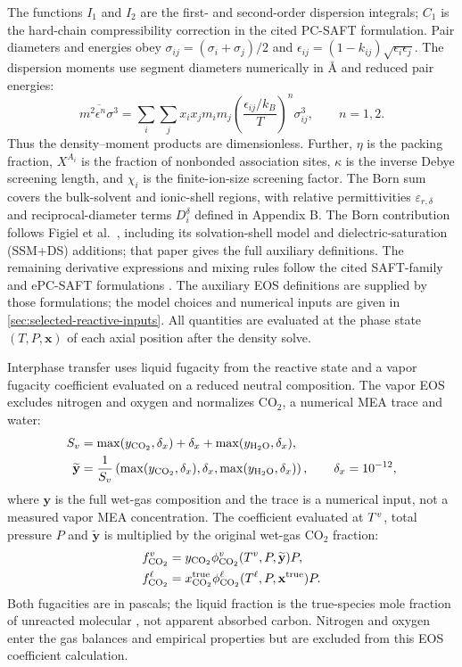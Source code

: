 The functions $I_1$ and $I_2$ are the first- and second-order dispersion integrals; $C_1$ is the hard-chain compressibility correction in the cited PC-SAFT formulation.
Pair diameters and energies obey $\sigma_{ij}=(\sigma_i+\sigma_j)/2$ and $\epsilon_{ij}=(1-k_{ij})\sqrt{\epsilon_i\epsilon_j}$.
The dispersion moments use segment diameters numerically in \unit{\angstrom} and reduced pair energies:
\begin{equation}
\overline{m^2\epsilon^n\sigma^3}
=\sum_i\sum_j x_i x_j m_i m_j
\left(\frac{\epsilon_{ij}/k_B}{T}\right)^n\sigma_{ij}^3,
\qquad n=1,2.
\end{equation}
Thus the density--moment products are dimensionless.
Further, $\eta$ is the packing fraction, $X^{A_i}$ is the fraction of nonbonded association sites, $\kappa$ is the inverse Debye screening length, and $\chi_i$ is the finite-ion-size screening factor.
The Born sum covers the bulk-solvent and ionic-shell regions, with relative permittivities $\varepsilon_{r,\delta}$ and reciprocal-diameter terms $D_i^{\delta}$ defined in Appendix B.
The Born contribution follows Figiel et al.\ \cite{Figiel2025}, including its solvation-shell model and dielectric-saturation (SSM+DS) additions; that paper gives the full auxiliary definitions.
The remaining derivative expressions and mixing rules follow the cited SAFT-family and ePC-SAFT formulations \cite{Gross2001,Cameretti2005,Bulow2019,Bulow2020,Bulow2021a}.
The auxiliary EOS definitions are supplied by those formulations; the model choices and numerical inputs are given in \cref{sec:selected-reactive-inputs}.
All quantities are evaluated at the phase state $(T,P,\mathbf{x})$ of each axial position after the density solve.

Interphase \COtwo{} transfer uses liquid fugacity from the reactive state and a vapor fugacity coefficient evaluated on a reduced neutral composition.
The vapor EOS excludes nitrogen and oxygen and normalizes CO$_2$, a numerical MEA trace and water:
\begin{align}
S_v&=\max(y_{\COtwo},\delta_x)+\delta_x+\max(y_{\HtwoO},\delta_x),\\
\widetilde{\mathbf y}&=\frac{1}{S_v}
\left(\max(y_{\COtwo},\delta_x),\delta_x,\max(y_{\HtwoO},\delta_x)\right),
\qquad\delta_x=10^{-12},\label{eq:reduced-vapor}\end{align}
where $\mathbf y$ is the full wet-gas composition and the trace is a numerical input, not a measured vapor MEA concentration.
The coefficient evaluated at $T^v$, total pressure $P$ and $\widetilde{\mathbf y}$ is multiplied by the original wet-gas CO$_2$ fraction:
\begin{align}
f_{\COtwo}^{\vap}&=y_{\COtwo}\phi_{\COtwo}^{\vap}(T^\vap,P,\widetilde{\mathbf y})P,\\
f_{\COtwo}^{\liq}&=x_{\COtwo}^{\mathrm{true}}\phi_{\COtwo}^{\liq}(T^\liq,P,\mathbf x^{\mathrm{true}})P.
\label{eq:co2-fugacity}
\end{align}
Both fugacities are in pascals; the liquid fraction is the true-species mole fraction of unreacted molecular \COtwo{}, not apparent absorbed carbon.
Nitrogen and oxygen enter the gas balances and empirical properties but are excluded from this EOS coefficient calculation.

